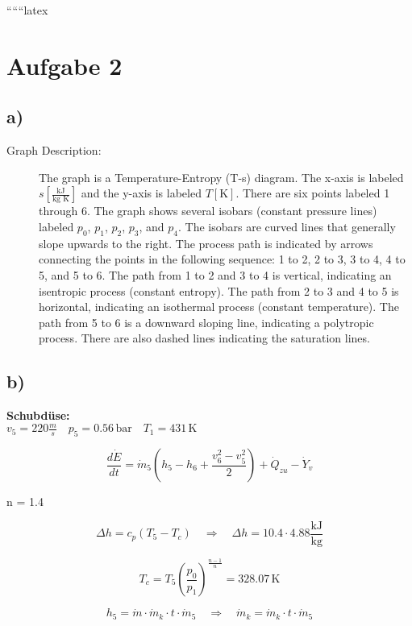 
``````latex


\section*{Aufgabe 2}

\subsection*{a)}

\begin{description}
    \item[Graph Description:] The graph is a Temperature-Entropy (T-s) diagram. The x-axis is labeled \( s \left[ \frac{\text{kJ}}{\text{kg K}} \right] \) and the y-axis is labeled \( T \left[ \text{K} \right] \). There are six points labeled 1 through 6. The graph shows several isobars (constant pressure lines) labeled \( p_0 \), \( p_1 \), \( p_2 \), \( p_3 \), and \( p_4 \). The isobars are curved lines that generally slope upwards to the right. The process path is indicated by arrows connecting the points in the following sequence: 1 to 2, 2 to 3, 3 to 4, 4 to 5, and 5 to 6. The path from 1 to 2 and 3 to 4 is vertical, indicating an isentropic process (constant entropy). The path from 2 to 3 and 4 to 5 is horizontal, indicating an isothermal process (constant temperature). The path from 5 to 6 is a downward sloping line, indicating a polytropic process. There are also dashed lines indicating the saturation lines.
\end{description}

\subsection*{b)}

\textbf{Schubdüse:} \\
\( v_5 = 220 \frac{m}{s} \quad p_5 = 0.56 \, \text{bar} \quad T_1 = 431 \, \text{K} \)

\[
\frac{d \dot{E}}{d t} = \dot{m}_5 \left( h_5 - h_6 + \frac{v_6^2 - v_5^2}{2} \right) + \dot{Q}_{zu} - \dot{Y}_{v}
\]

 n = 1.4

\[
\Delta h = c_p (T_5 - T_c) \quad \Rightarrow \quad \Delta h = 10.4 \cdot 4.88 \frac{\text{kJ}}{\text{kg}}
\]

\[
T_c = T_5 \left( \frac{p_0}{p_1} \right)^{\frac{n-1}{n}} = 328.07 \, \text{K}
\]

\[
h_5 = \dot{m} \cdot \dot{m}_k \cdot t \cdot \dot{m}_5 \quad \Rightarrow \quad \dot{m}_k = \dot{m}_k \cdot t \cdot \dot{m}_5
\]

